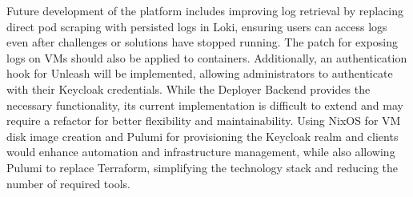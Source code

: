 Future development of the platform includes improving log retrieval by replacing direct pod scraping with persisted logs in Loki, ensuring users can access logs even after challenges or solutions have stopped running. The patch for exposing logs on VMs should also be applied to containers. Additionally, an authentication hook for Unleash will be implemented, allowing administrators to authenticate with their Keycloak credentials. While the Deployer Backend provides the necessary functionality, its current implementation is difficult to extend and may require a refactor for better flexibility and maintainability. Using NixOS for VM disk image creation and Pulumi for provisioning the Keycloak realm and clients would enhance automation and infrastructure management, while also allowing Pulumi to replace Terraform, simplifying the technology stack and reducing the number of required tools.

\cleardoublepage
{}
{}
\printbibliography
